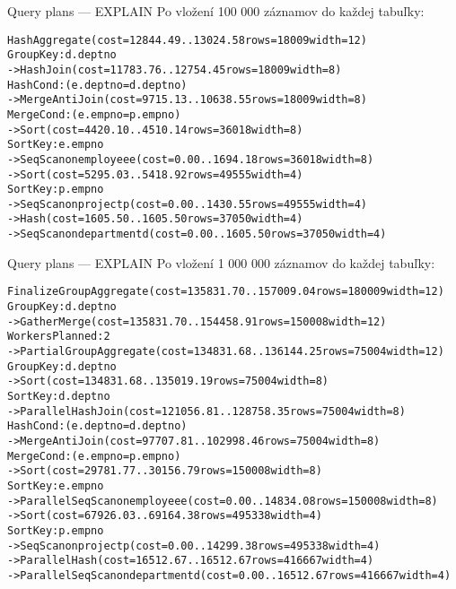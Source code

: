 \documentclass[12pt]{beamer}
\begin{document}
\begin{frame}[fragile]{Query plans --- EXPLAIN}
Po vložení 100 000 záznamov do každej tabuľky:
\scriptsize
\begin{alltt}
HashAggregate  (cost=12844.49..13024.58 rows=18009 width=12)
  Group Key: d.deptno
  ->  Hash Join  (cost=11783.76..12754.45 rows=18009 width=8)
        Hash Cond: (e.deptno = d.deptno)
        ->  Merge Anti Join  (cost=9715.13..10638.55 rows=18009 width=8)
              Merge Cond: (e.empno = p.empno)
              ->  Sort  (cost=4420.10..4510.14 rows=36018 width=8)
                    Sort Key: e.empno
                    ->  Seq Scan on employee e  (cost=0.00..1694.18 rows=36018 width=8)
              ->  Sort  (cost=5295.03..5418.92 rows=49555 width=4)
                    Sort Key: p.empno
                    ->  Seq Scan on project p  (cost=0.00..1430.55 rows=49555 width=4)
        ->  Hash  (cost=1605.50..1605.50 rows=37050 width=4)
              ->  Seq Scan on department d  (cost=0.00..1605.50 rows=37050 width=4)
\end{alltt}
\end{frame}

\begin{frame}[fragile]{Query plans --- EXPLAIN}
Po vložení 1 000 000 záznamov do každej tabuľky:
\tiny
\begin{alltt}
Finalize GroupAggregate  (cost=135831.70..157009.04 rows=180009 width=12)
  Group Key: d.deptno
  ->  Gather Merge  (cost=135831.70..154458.91 rows=150008 width=12)
        Workers Planned: 2
        ->  Partial GroupAggregate  (cost=134831.68..136144.25 rows=75004 width=12)
              Group Key: d.deptno
              ->  Sort  (cost=134831.68..135019.19 rows=75004 width=8)
                    Sort Key: d.deptno
                    ->  Parallel Hash Join  (cost=121056.81..128758.35 rows=75004 width=8)
                          Hash Cond: (e.deptno = d.deptno)
                          ->  Merge Anti Join  (cost=97707.81..102998.46 rows=75004 width=8)
                                Merge Cond: (e.empno = p.empno)
                                ->  Sort  (cost=29781.77..30156.79 rows=150008 width=8)
                                      Sort Key: e.empno
                                      ->  Parallel Seq Scan on employee e  (cost=0.00..14834.08 rows=150008 width=8)
                                ->  Sort  (cost=67926.03..69164.38 rows=495338 width=4)
                                      Sort Key: p.empno
                                      ->  Seq Scan on project p  (cost=0.00..14299.38 rows=495338 width=4)
                          ->  Parallel Hash  (cost=16512.67..16512.67 rows=416667 width=4)
                                ->  Parallel Seq Scan on department d  (cost=0.00..16512.67 rows=416667 width=4)
\end{alltt}
\end{frame}
\end{document}
